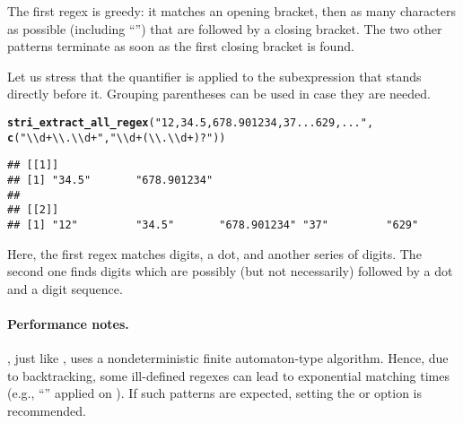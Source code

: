 \documentclass[nojss]{jss}\usepackage[]{graphicx}\usepackage[]{xcolor}
\makeatletter
\newcommand{\hlstr}[1]{\textcolor[rgb]{0.192,0.494,0.8}{#1}}%
\newcommand{\hlstd}[1]{\textcolor[rgb]{0.345,0.345,0.345}{#1}}%
\newcommand{\hlkwd}[1]{\textcolor[rgb]{0.737,0.353,0.396}{\textbf{#1}}}%
\newenvironment{kframe}{%
 \def\at@end@of@kframe{}%
 \ifinner\ifhmode%
  \def\at@end@of@kframe{\end{minipage}}%
  \begin{minipage}{\columnwidth}%
 \fi\fi%
 \def\FrameCommand##1{\hskip\@totalleftmargin \hskip-\fboxsep
 \colorbox{shadecolor}{##1}\hskip-\fboxsep
     \hskip-\linewidth \hskip-\@totalleftmargin \hskip\columnwidth}%
 \MakeFramed {\advance\hsize-\width
   \@totalleftmargin\z@ \linewidth\hsize
   \@setminipage}}%
 {\par\unskip\endMakeFramed%
 \at@end@of@kframe}
\newenvironment{knitrout}{}{} %
\makeatother
\begin{document}
The first regex is greedy: it matches an opening bracket,
then as many characters as possible (including ``\code{)}'')
that are followed by a closing bracket.
The two other patterns terminate as soon as the first closing
bracket is found.



Let us stress that the quantifier is applied to the subexpression
that stands directly before it. Grouping parentheses can be used in case
they are needed.

\begin{knitrout}
\color{fgcolor}\begin{kframe}
\begin{alltt}
\hlkwd{stri_extract_all_regex}\hlstd{(}\hlstr{"12, 34.5, 678.901234, 37...629, ..."}\hlstd{,}
  \hlkwd{c}\hlstd{(}\hlstr{"\textbackslash{}\textbackslash{}d+\textbackslash{}\textbackslash{}.\textbackslash{}\textbackslash{}d+"}\hlstd{,} \hlstr{"\textbackslash{}\textbackslash{}d+(\textbackslash{}\textbackslash{}.\textbackslash{}\textbackslash{}d+)?"}\hlstd{))}
\end{alltt}
\begin{verbatim}
## [[1]]
## [1] "34.5"       "678.901234"
## 
## [[2]]
## [1] "12"         "34.5"       "678.901234" "37"         "629"
\end{verbatim}
\end{kframe}
\end{knitrout}

Here, the first regex matches digits, a dot, and another series of digits.
The second one finds digits which are possibly (but not necessarily)
followed by a dot and a digit sequence.





\paragraph{Performance notes.}
, just like , uses a nondeterministic finite automaton-type
algorithm. Hence, due to backtracking, some ill-defined regexes can lead to
exponential matching times (e.g., ``'' applied on ).
If such patterns are expected, setting the  or 
option is recommended.
\end{document}
